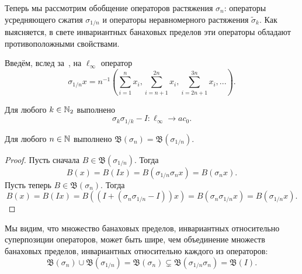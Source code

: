 Теперь мы рассмотрим обобщение операторов растяжения $\sigma_n$:
операторы усредняющего сжатия $\sigma_{1/n}$
и операторы неравномерного растяжения $\tilde\sigma_k$.
Как выясняется, в свете инвариантных банаховых пределов
эти операторы обладают противоположными свойствами.


Введём, вслед за~\cite[с. 131, утверждение 2.b.2]{lindenstrauss1979classical},
на $\ell_\infty$ оператор
\begin{equation}
	\sigma_{1/n} x = n^{-1}
	\left(
		\sum_{i=1}^{n} x_i,
		\sum_{i=n+1}^{2n} x_i,
		\sum_{i=2n+1}^{3n} x_i,
		...
	\right).
\end{equation}

\begin{lemma}
	Для любого $k\in\mathbb{N}_2$ выполнено
	\begin{equation}
		\sigma_k \sigma_{1/k} - I : \ell_\infty \to ac_0
		.
	\end{equation}
\end{lemma}


\begin{proposition}
	\label{thm:B_sigma_n_eq_B_sigma_1_n}
	Для любого $n\in\mathbb{N}$ выполнено $\mathfrak{B}(\sigma_n) = \mathfrak{B}(\sigma_{1/n})$.
\end{proposition}

\begin{proof}
	Пусть сначала $B \in \mathfrak{B}(\sigma_{1/n})$.
	Тогда
	\begin{equation}
		B(x) = B(Ix) = B(\sigma_{1/n} \sigma_n x) = B(\sigma_n x)
		.
	\end{equation}
	Пусть теперь $B \in \mathfrak{B}(\sigma_n)$.
	Тогда
	\begin{equation}
		B(x) = B(Ix) = B((I+(\sigma_n \sigma_{1/n} - I)) x) = B(\sigma_n \sigma_{1/n} x) = B(\sigma_{1/n} x)
		.
	\end{equation}
\end{proof}

	Мы видим, что множество банаховых пределов, инвариантных относительно суперпозиции операторов,
	может быть шире, чем объединение множеств банаховых пределов,
	инвариантных относительно каждого из операторов:
	\begin{equation}
		\mathfrak{B}(\sigma_n) \cup \mathfrak{B}(\sigma_{1/n}) = \mathfrak{B}(\sigma_n) \subsetneq \mathfrak{B}(\sigma_{1/n}\sigma_n) = \mathfrak{B}(I)
		.
	\end{equation}
